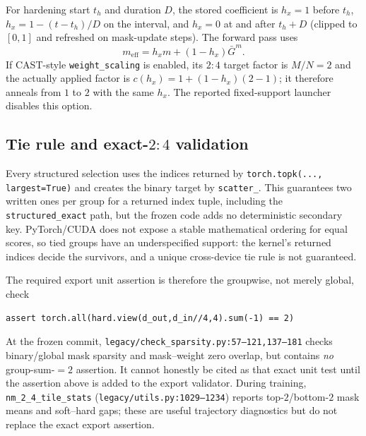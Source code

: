 \documentclass{article}
\begin{document}
For hardening start $t_h$ and duration $D$, the stored coefficient is
$h_x=1$ before $t_h$, $h_x=1-(t-t_h)/D$ on the interval, and $h_x=0$ at and
after $t_h+D$ (clipped to $[0,1]$ and refreshed on mask-update steps). The
forward pass uses
\begin{equation}
m_{\mathrm{eff}}=h_xm+(1-h_x)\bar G^m.
\end{equation}
If CAST-style \texttt{weight\_scaling} is enabled, its $2{:}4$ target factor
is $M/N=2$ and the actually applied factor is
$c(h_x)=1+(1-h_x)(2-1)$; it therefore anneals from $1$ to $2$ with the same
$h_x$. The reported fixed-support launcher disables this option.

\subsection{Tie rule and exact-$2{:}4$ validation}
Every structured selection uses the indices returned by
\texttt{torch.topk(..., largest=True)} and creates the binary target by
\texttt{scatter\_}. This guarantees two written ones per group for a returned
index tuple, including the \texttt{structured\_exact} path, but the frozen
code adds no deterministic secondary key. PyTorch/CUDA does not expose a
stable mathematical ordering for equal scores, so tied groups have an
underspecified support: the kernel's returned indices decide the survivors,
and a unique cross-device tie rule is not guaranteed.

The required export unit assertion is therefore the groupwise, not merely
global, check
\begin{verbatim}
assert torch.all(hard.view(d_out,d_in//4,4).sum(-1) == 2)
\end{verbatim}
At the frozen commit, \texttt{legacy/check\_sparsity.py:57--121,137--181}
checks binary/global mask sparsity and mask--weight zero overlap, but contains
\emph{no} group-sum-$=2$ assertion. It cannot honestly be cited as that exact
unit test until the assertion above is added to the export validator. During
training, \texttt{nm\_2\_4\_tile\_stats}
(\texttt{legacy/utils.py:1029--1234}) reports top-$2$/bottom-$2$ mask means and
soft--hard gaps; these are useful trajectory diagnostics but do not replace
the exact export assertion.

\end{document}
